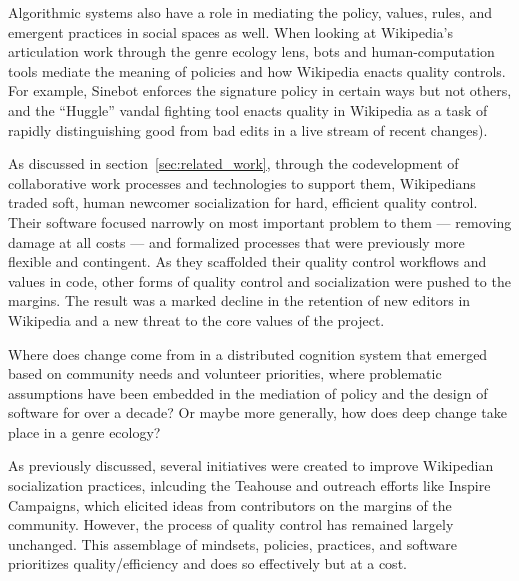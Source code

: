 Algorithmic systems also have a role in mediating the policy, values, rules, and emergent practices in social spaces as well\cite{lessig1999code,suchman2007human,orlikowski2015algorithm}.  When looking at Wikipedia's articulation work through the genre ecology lens, bots and human-computation tools mediate the meaning of policies and how Wikipedia enacts quality controls. For example, Sinebot enforces the signature policy in certain ways but not others\cite{geiger2011lives}, and the ``Huggle'' vandal fighting tool enacts quality in Wikipedia as a task of rapidly distinguishing good from bad edits in a live stream of recent changes\cite{halfaker2014snuggle}).

As discussed in section~\ref{sec:related_work}, through the codevelopment of collaborative work processes and technologies to support them, Wikipedians traded soft, human newcomer socialization for hard, efficient quality control. Their software focused narrowly on most important problem to them --- removing damage at all costs --- and formalized processes that were previously more flexible and contingent. As they scaffolded their quality control workflows and values in code, other forms of quality control and socialization were pushed to the margins.  The result was a marked decline in the retention of new editors in Wikipedia and a new threat to the core values of the project.

Where does change come from in a distributed cognition system that emerged based on community needs and volunteer priorities, where problematic assumptions have been embedded in the mediation of policy and the design of software for over a decade?  Or maybe more generally, how does deep change take place in a genre ecology?

As previously discussed, several initiatives were created to improve Wikipedian socialization practices, inlcuding the Teahouse and outreach efforts like Inspire Campaigns\cite{morgan2015what}, which elicited ideas from contributors on the margins of the community. However, the process of quality control has remained largely unchanged.  This assemblage of mindsets, policies, practices, and software prioritizes quality/efficiency and does so effectively \cite{geiger2013levee}\cite{halfaker2014snuggle} but at a cost.

